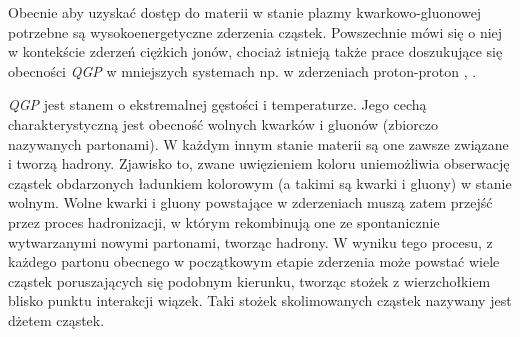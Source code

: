 Obecnie aby uzyskać dostęp do materii w stanie plazmy kwarkowo-gluonowej potrzebne są wysokoenergetyczne zderzenia cząstek. Powszechnie mówi się o niej w kontekście zderzeń ciężkich jonów, chociaż istnieją także prace doszukujące się obecności \textit{QGP} w mniejszych systemach np. w zderzeniach proton-proton \cite{Khachatryan:2016txc}, \cite{ALICE:2017jyt}. 

\textit{QGP} jest stanem o ekstremalnej gęstości i temperaturze. Jego cechą charakterystyczną jest obecność wolnych kwarków i gluonów (zbiorczo nazywanych partonami). 
W każdym innym stanie materii są one zawsze związane i tworzą hadrony. Zjawisko to, zwane uwięzieniem koloru  uniemożliwia obserwację cząstek obdarzonych ładunkiem kolorowym (a takimi są kwarki i gluony) w stanie wolnym.
Wolne kwarki i gluony powstające w zderzeniach muszą zatem przejść przez proces hadronizacji, w którym  rekombinują one ze spontanicznie wytwarzanymi nowymi partonami, tworząc hadrony. W wyniku tego procesu, z każdego partonu obecnego w początkowym etapie zderzenia może powstać wiele cząstek poruszających się podobnym kierunku, tworząc stożek z wierzchołkiem blisko punktu interakcji wiązek. Taki stożek skolimowanych cząstek nazywany jest dżetem cząstek.




